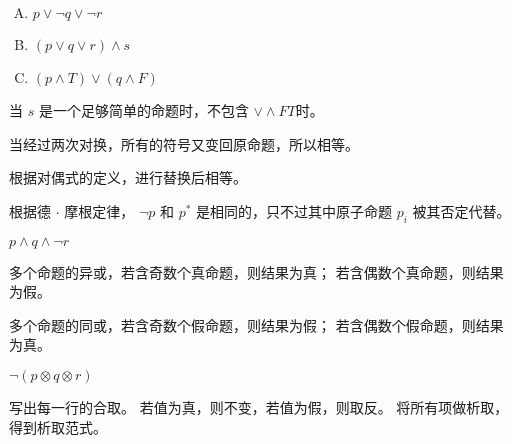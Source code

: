 {{        %
        \begin{practices}
            \begin{enumerate}[A.]
                \item $p \vee \neg q \vee \neg r$
                \item $(p \vee q \vee r) \wedge s$
                \item $(p \wedge T) \vee (q \wedge F)$
            \end{enumerate}
        \end{practices}

        \begin{practices}
            当 $s$ 是一个足够简单的命题时，不包含 $\vee \wedge F T$时。
        \end{practices}

        \begin{practices}
            当经过两次对换，所有的符号又变回原命题，所以相等。
        \end{practices}

        \begin{practices}
            根据对偶式的定义，进行替换后相等。
        \end{practices}

        \begin{practices}
            根据德 $\cdot$ 摩根定律， $\neg p$ 和 $p^{*}$ 是相同的，只不过其中原子命题 $p_i$ 被其否定代替。
        \end{practices}

        \begin{practices}
            $p \wedge q \wedge \neg r$
        \end{practices}

        \begin{practices}
            多个命题的异或，若含奇数个真命题，则结果为真；
            若含偶数个真命题，则结果为假。

            多个命题的同或，若含奇数个假命题，则结果为假；
            若含偶数个假命题，则结果为真。

            $\neg (p \otimes q \otimes r)$
        \end{practices}

        \begin{practices}
            写出每一行的合取。
            若值为真，则不变，若值为假，则取反。
            将所有项做析取，得到析取范式。
        \end{practices}

}}
